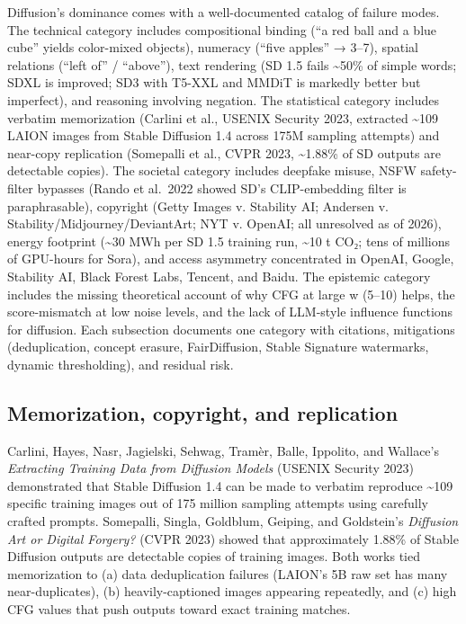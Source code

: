 Diffusion's dominance comes with a well-documented catalog of failure modes. The technical category includes compositional binding (``a red ball and a blue cube'' yields color-mixed objects), numeracy (``five apples'' → 3--7), spatial relations (``left of'' / ``above''), text rendering (SD 1.5 fails \textasciitilde50\% of simple words; SDXL is improved; SD3 with T5-XXL and MMDiT is markedly better but imperfect), and reasoning involving negation. The statistical category includes verbatim memorization (Carlini et al., USENIX Security 2023, extracted \textasciitilde109 LAION images from Stable Diffusion 1.4 across 175M sampling attempts) and near-copy replication (Somepalli et al., CVPR 2023, \textasciitilde1.88\% of SD outputs are detectable copies). The societal category includes deepfake misuse, NSFW safety-filter bypasses (Rando et al.~2022 showed SD's CLIP-embedding filter is paraphrasable), copyright (Getty Images v. Stability AI; Andersen v. Stability/Midjourney/DeviantArt; NYT v. OpenAI; all unresolved as of 2026), energy footprint (\textasciitilde30 MWh per SD 1.5 training run, \textasciitilde10 t CO₂; tens of millions of GPU-hours for Sora), and access asymmetry concentrated in OpenAI, Google, Stability AI, Black Forest Labs, Tencent, and Baidu. The epistemic category includes the missing theoretical account of why CFG at large w (5--10) helps, the score-mismatch at low noise levels, and the lack of LLM-style influence functions for diffusion. Each subsection documents one category with citations, mitigations (deduplication, concept erasure, FairDiffusion, Stable Signature watermarks, dynamic thresholding), and residual risk.

\subsection{Memorization, copyright, and replication}\label{memorization-copyright-and-replication}

Carlini, Hayes, Nasr, Jagielski, Sehwag, Tramèr, Balle, Ippolito, and Wallace's \emph{Extracting Training Data from Diffusion Models} (USENIX Security 2023) demonstrated that Stable Diffusion 1.4 can be made to verbatim reproduce \textasciitilde109 specific training images out of 175 million sampling attempts using carefully crafted prompts. Somepalli, Singla, Goldblum, Geiping, and Goldstein's \emph{Diffusion Art or Digital Forgery?} (CVPR 2023) showed that approximately 1.88\% of Stable Diffusion outputs are detectable copies of training images. Both works tied memorization to (a) data deduplication failures (LAION's 5B raw set has many near-duplicates), (b) heavily-captioned images appearing repeatedly, and (c) high CFG values that push outputs toward exact training matches.


